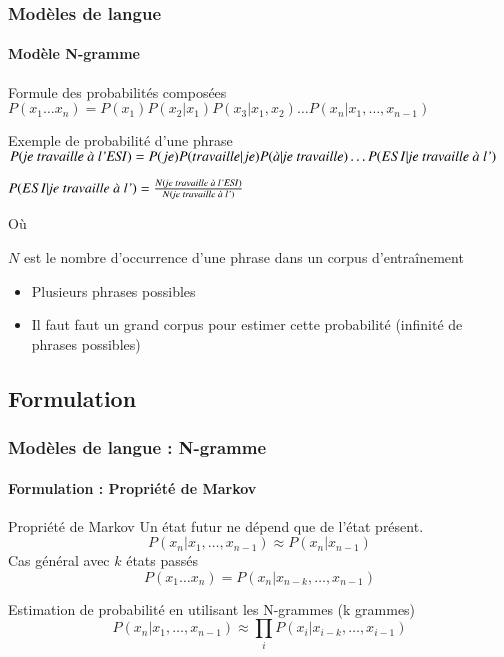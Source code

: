 \documentclass[xcolor=table]{beamer}
\begin{document}
\begin{frame}
\frametitle{Modèles de langue}
\framesubtitle{Modèle N-gramme}

\begin{block}{Formule des probabilités composées}
	$ P(x_1 \ldots x_n) =  P(x_1) P(x_2 | x_1) P(x_3 | x_1, x_2) \ldots P(x_n | x_1, \ldots, x_{n-1})$
\end{block}


\begin{exampleblock}{Exemple de probabilité d'une phrase}
	$ P(\text{\textit{je travaille à l'ESI}}) =  P(je) P(travaille | je) P(\text{\textit{à}} | \text{\textit{je travaille}}) \ldots P(ESI | \text{\textit{je travaille à l'}})$
	
	$P(ESI | \text{\textit{je travaille à l'}}) = \frac{N(\text{\textit{je travaille à l'ESI}})}{N( \text{\textit{je travaille à l'}})}$ 
	
	Où 
	
	$N$ est le nombre d'occurrence d'une phrase dans un corpus d'entraînement
\end{exampleblock}

\begin{itemize}
	\item Plusieurs phrases possibles
	\item Il faut faut un grand corpus pour estimer cette probabilité (infinité de phrases possibles)
\end{itemize}

\end{frame}

\subsection{Formulation}

\begin{frame}
\frametitle{Modèles de langue : N-gramme}
\framesubtitle{Formulation : Propriété de Markov}

\begin{block}{Propriété de Markov}
	Un état futur ne dépend que de l'état présent. 
	\[%
	P(x_n | x_1,\ldots, x_{n-1}) \approx P(x_n | x_{n-1})
	\]
	Cas général avec $k$ états passés 
	\[%
	P(x_1 \ldots x_n) = P(x_n | x_{n-k}, \ldots, x_{n-1})
	\]
\end{block}

\begin{block}{Estimation de probabilité en utilisant les N-grammes (k grammes)}
	\[
	P(x_n | x_1,\ldots, x_{n-1}) \approx \prod_i P(x_i | x_{i-k}, \ldots, x_{i-1})
	\]
\end{block}

\end{frame}
\end{document}
